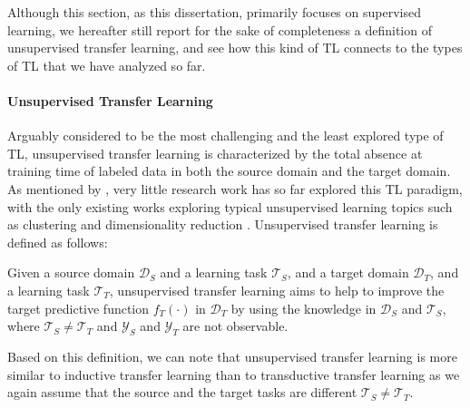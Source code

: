 Although this section, as this dissertation, primarily focuses on supervised learning, we hereafter still report for the sake of completeness a definition of unsupervised transfer learning, and see how this kind of TL connects to the types of TL that we have analyzed so far.

\paragraph{Unsupervised Transfer Learning}
Arguably considered to be the most challenging and the least explored type of TL, unsupervised transfer learning is characterized by the total absence at training time of labeled data in both the source domain and the target domain. As mentioned by \citet{pan2009survey}, very little research work has so far explored this TL paradigm, with the only existing works exploring typical unsupervised learning topics such as clustering \cite{dai2008self, jin2011transferring, qian2015cluster} and dimensionality reduction \cite{wang2008transferred, zhu2013self, zhu2016robust}. Unsupervised transfer learning is defined as follows:
\begin{definition}
	Given a source domain $\mathcal{D}_S$ and a learning task $\mathcal{T}_S$, and a target domain $\mathcal{D}_T$, and a learning task $\mathcal{T}_T$, unsupervised transfer learning aims to help to improve the target predictive function $f_T(\cdot)$ in $\mathcal{D}_T$ by using the knowledge in $\mathcal{D}_S$ and $\mathcal{T}_S$, where $\mathcal{T}_S \neq \mathcal{T}_T$ and $\mathcal{Y}_S$ and $\mathcal{Y}_T$ are not observable. 
\end{definition}
Based on this definition, we can note that unsupervised transfer learning is more similar to inductive transfer learning than to transductive transfer learning as we again assume that the source and the target tasks are different $\mathcal{T}_S \neq \mathcal{T}_T$.


